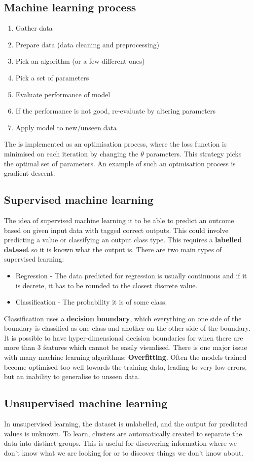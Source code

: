 \documentclass[CS5104-Notes.tex]{subfiles}
\begin{document}
\subsection{Machine learning process}
\begin{enumerate}
  \item Gather data
  \item Prepare data (data cleaning and preprocessing)
  \item Pick an algorithm (or a few different ones)
  \item Pick a set of parameters
  \item Evaluate performance of model
  \item If the performance is not good, re-evaluate by altering parameters
  \item Apply model to new/unseen data
\end{enumerate}
The is implemented as an optimisation process, where the loss function is minimised on each iteration by changing the $\theta$ parameters. This strategy picks the optimal set of parameters. An example of such an optmisation process is gradient descent.


\subsection{Supervised machine learning}
The idea of supervised machine learning it to be able to predict an outcome based on given input data with tagged correct outputs. This could involve predicting a value or classifying an output class type. This requires a \textbf{labelled dataset} so it is known what the output is. There are two main types of supervised learning:
\begin{itemize}
\item Regression - The data predicted for regression is usually continuous and if it is decrete, it has to be rounded to the closest discrete value.
\item Classification - The probability it is of some class.
\end{itemize}
Classification uses a \textbf{decision boundary}, which everything on one side of the boundary is classified as one class and another on the other side of the boundary. It is possible to have hyper-dimensional decision boundaries for when there are more than 3 features which cannot be easily visualised. 
\n
There is one major issue with many machine learning algorithms: \textbf{Overfitting}. Often the models trained become optimised too well towards the training data, leading to very low errors, but an inability to generalise to unseen data. 

\subsection{Unsupervised machine learning}
In unsupervised learning, the dataset is unlabelled, and the output for predicted values is unknown. To learn, clusters are automatically created to separate the data into distinct groups. This is useful for discovering information where we don't know what we are looking for or to discover things we don't know about.
\end{document}
